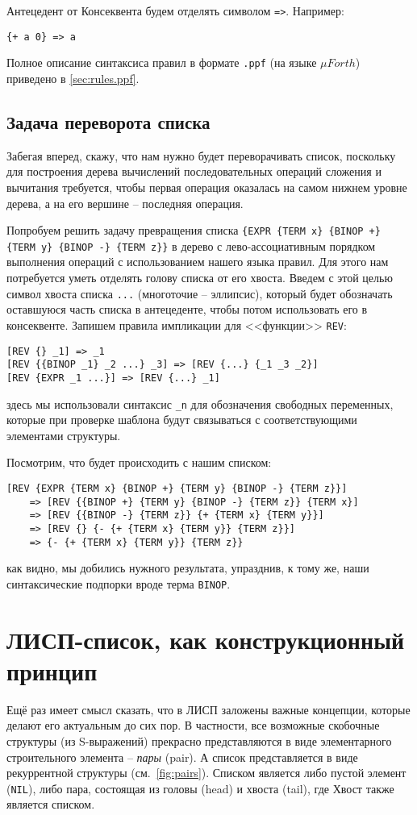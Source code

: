 \documentclass[10pt]{report}
\begin{document}
Антецедент от Консеквента будем отделять символом \verb|=>|.
Например:
\begin{verbatim}
{+ a 0} => a
\end{verbatim}
Полное описание синтаксиса правил в формате \texttt{.ppf}  (на языке $\mu Forth$) приведено в \ref{sec:rules.ppf}.
 
\subsection{Задача переворота списка}
Забегая вперед, скажу, что нам нужно будет переворачивать список, поскольку для построения дерева вычислений последовательных операций сложения и вычитания требуется, чтобы первая операция оказалась на самом нижнем уровне дерева, а на его вершине -- последняя операция.

Попробуем решить задачу превращения списка \verb|{EXPR {TERM x} {BINOP +} {TERM y} {BINOP -} {TERM z}}| в дерево с лево-ассоциативным порядком выполнения операций с использованием нашего языка правил.
Для этого нам потребуется уметь отделять голову списка от его хвоста.
Введем с этой целью символ хвоста списка \verb|...| (многоточие -- эллипсис), который будет обозначать оставшуюся часть списка в антецеденте, чтобы потом использовать его в консеквенте. Запишем правила импликации для <<функции>> \verb|REV|:
\begin{verbatim}
[REV {} _1] => _1
[REV {{BINOP _1} _2 ...} _3] => [REV {...} {_1 _3 _2}]
[REV {EXPR _1 ...}] => [REV {...} _1]  
\end{verbatim}
здесь мы использовали синтаксис \verb|_n| для обозначения свободных переменных, которые при проверке шаблона будут связываться с соответствующими элементами структуры.

Посмотрим, что будет происходить с нашим списком: 
\begin{verbatim}
[REV {EXPR {TERM x} {BINOP +} {TERM y} {BINOP -} {TERM z}}]
    => [REV {{BINOP +} {TERM y} {BINOP -} {TERM z}} {TERM x}]
    => [REV {{BINOP -} {TERM z}} {+ {TERM x} {TERM y}}]
    => [REV {} {- {+ {TERM x} {TERM y}} {TERM z}}]
    => {- {+ {TERM x} {TERM y}} {TERM z}}
\end{verbatim}
как видно, мы добились нужного результата, упразднив, к тому же, наши синтаксические подпорки вроде терма \verb|BINOP|.
 
\section{ЛИСП-список, как конструкционный принцип}
Ещё раз имеет смысл сказать, что в ЛИСП заложены важные концепции, которые делают его актуальным до сих пор.
В частности, все возможные скобочные структуры (из S-выражений) прекрасно представляются в виде элементарного строительного элемента -- {\em пары} (pair). А список представляется в виде рекуррентной структуры (см.~\autoref{fig:pairs}). Списком является либо пустой элемент (\texttt{NIL}), либо пара, состоящая из головы (head) и хвоста (tail), где Хвост также является списком.
\end{document}
